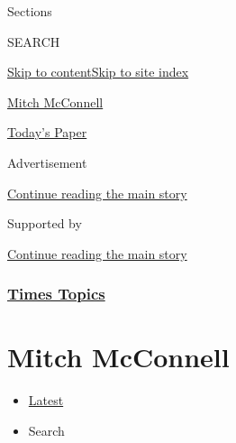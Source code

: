Sections

SEARCH

\protect\hyperlink{site-content}{Skip to
content}\protect\hyperlink{site-index}{Skip to site index}

\href{https://www.nytimes3xbfgragh.onion/topic/person/mitch-mcconnell}{Mitch
McConnell}

\href{https://myaccount.nytimes3xbfgragh.onion/auth/login?response_type=cookie\&client_id=vi}{}

\href{https://www.nytimes3xbfgragh.onion/section/todayspaper}{Today's
Paper}

Advertisement

\protect\hyperlink{after-top}{Continue reading the main story}

Supported by

\protect\hyperlink{after-sponsor}{Continue reading the main story}

\hypertarget{times-topics}{%
\subsubsection{\texorpdfstring{\href{/index.html}{Times
Topics}}{Times Topics}}\label{times-topics}}

\hypertarget{mitch-mcconnell}{%
\section{Mitch McConnell}\label{mitch-mcconnell}}

\begin{itemize}
\tightlist
\item
  \protect\hyperlink{stream-panel}{Latest}
\item
  Search
\end{itemize}

